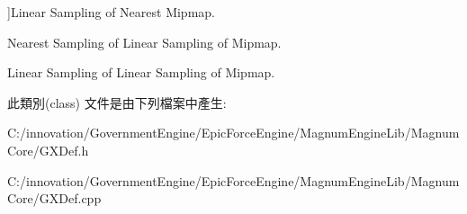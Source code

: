 \begin{Desc}
\begin{description}
{}]Linear Sampling of Nearest Mipmap. \item[{\em 
Nearest\+Mipmap\+Linear\hypertarget{class_i_dream_sky_1_1_g_x_texture_min_filter_mode_a53c413523e4864a1449a6d35f597d169aac76bf49bb8498d3522213755c26daf0}{}\label{class_i_dream_sky_1_1_g_x_texture_min_filter_mode_a53c413523e4864a1449a6d35f597d169aac76bf49bb8498d3522213755c26daf0}
}]Nearest Sampling of Linear Sampling of Mipmap. \item[{\em 
Linear\+Mipmap\+Linear\hypertarget{class_i_dream_sky_1_1_g_x_texture_min_filter_mode_a53c413523e4864a1449a6d35f597d169a4203be07e01d0b2c050d7b37cd2439fc}{}\label{class_i_dream_sky_1_1_g_x_texture_min_filter_mode_a53c413523e4864a1449a6d35f597d169a4203be07e01d0b2c050d7b37cd2439fc}
}]Linear Sampling of Linear Sampling of Mipmap. \end{description}
\end{Desc}


此類別(class) 文件是由下列檔案中產生\+:\begin{DoxyCompactItemize}
\item 
C\+:/innovation/\+Government\+Engine/\+Epic\+Force\+Engine/\+Magnum\+Engine\+Lib/\+Magnum\+Core/G\+X\+Def.\+h\item 
C\+:/innovation/\+Government\+Engine/\+Epic\+Force\+Engine/\+Magnum\+Engine\+Lib/\+Magnum\+Core/G\+X\+Def.\+cpp\end{DoxyCompactItemize}

